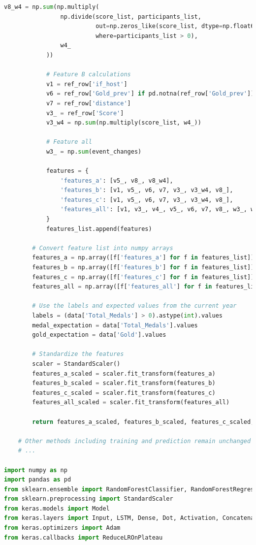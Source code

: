 \documentclass[12pt]{article}
\begin{document}
\begin{lstlisting}[language=Python, style=mystyle, caption=model.ipynb]
            v8_w4 = np.sum(np.multiply(
                np.divide(score_list, participants_list, 
                          out=np.zeros_like(score_list, dtype=np.float64), 
                          where=participants_list > 0),
                w4_
            ))

            # Feature B calculations
            v1 = ref_row['if_host']
            v6 = ref_row['Gold_prev'] if pd.notna(ref_row['Gold_prev']) else 0
            v7 = ref_row['distance']
            v3_ = ref_row['Score']
            v3_w4 = np.sum(np.multiply(score_list, w4_))

            # Feature all
            w3_ = np.sum(event_changes)

            features = {
                'features_a': [v5_, v8_, v8_w4],
                'features_b': [v1, v5_, v6, v7, v3_, v3_w4, v8_],
                'features_c': [v1, v5_, v6, v7, v3_, v3_w4, v8_],
                'features_all': [v1, v3_, v4_, v5_, v6, v7, v8_, w3_, w4_]
            }
            features_list.append(features)

        # Convert feature list into numpy arrays
        features_a = np.array([f['features_a'] for f in features_list])
        features_b = np.array([f['features_b'] for f in features_list])
        features_c = np.array([f['features_c'] for f in features_list])
        features_all = np.array([f['features_all'] for f in features_list])

        # Use the labels and expected values from the current year
        labels = (data['Total_Medals'] > 0).astype(int).values
        medal_expectation = data['Total_Medals'].values
        gold_expectation = data['Gold'].values

        # Standardize the features
        scaler = StandardScaler()
        features_a_scaled = scaler.fit_transform(features_a)
        features_b_scaled = scaler.fit_transform(features_b)
        features_c_scaled = scaler.fit_transform(features_c)
        features_all_scaled = scaler.fit_transform(features_all)

        return features_a_scaled, features_b_scaled, features_c_scaled, features_all_scaled, labels, medal_expectation, gold_expectation

    # Other methods including training and prediction remain unchanged
    # ...

import numpy as np
import pandas as pd
from sklearn.ensemble import RandomForestClassifier, RandomForestRegressor
from sklearn.preprocessing import StandardScaler
from keras.models import Model
from keras.layers import Input, LSTM, Dense, Dot, Activation, Concatenate
from keras.optimizers import Adam
from keras.callbacks import ReduceLROnPlateau


\end{lstlisting}
\end{document}
